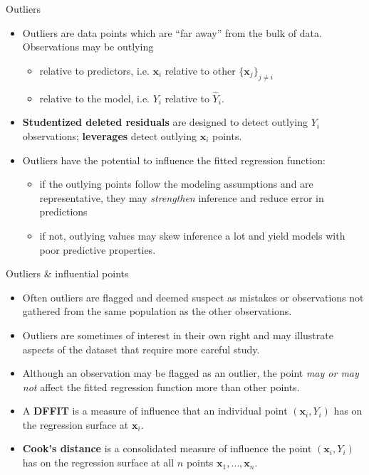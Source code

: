 \documentclass{beamer}
\begin{document}
\begin{frame}{Outliers}
\begin{itemize}
\item Outliers are data points which are ``far away'' from the bulk of data. \pause Observations may be outlying 
\begin{itemize}
    \item relative to predictors, i.e. $\mathbf{x}_i$ relative to other $\{\mathbf{x}_j\}_{j\ne i}$
    \item\pause relative to the model, i.e. $Y_i$ relative to $\hat{Y}_i$.
\end{itemize} 
\item\pause \textbf{Studentized deleted residuals} are designed to detect outlying $Y_i$ observations; \textbf{leverages} detect outlying $\mathbf{x}_i$ points.
\item\pause Outliers have the potential to influence the fitted regression
function:
\begin{itemize}
\item\pause if the outlying points follow the modeling
assumptions and are representative, they may \textit{strengthen} inference and reduce error in predictions 
\item\pause if not, outlying values may skew inference a lot and yield
models with poor predictive properties.
\end{itemize}
\end{itemize}
\end{frame}

\begin{frame}{Outliers \& influential points}
\begin{itemize}
\item Often outliers are flagged and deemed suspect as mistakes
or observations not gathered from the same population as the other observations.
\item\pause Outliers are sometimes of interest in their own right and may illustrate aspects of the dataset that require more careful study.
\item\pause Although an observation may be flagged as an outlier, the
point \textit{may or may not} affect the fitted regression function
more than other points.
\item\pause A \textbf{DFFIT} is a measure of influence that an individual point
$(\mathbf{x}_i, Y_i)$ has on the regression surface at $\mathbf{x}_i$.
\item\pause \textbf{Cook's distance} is a consolidated measure of influence the point $(\mathbf{x}_i, Y_i)$ has on the regression surface at all $n$ points $\mathbf{x}_1, \ldots, \mathbf{x}_n$.
\end{itemize}
\end{frame}
\end{document}
